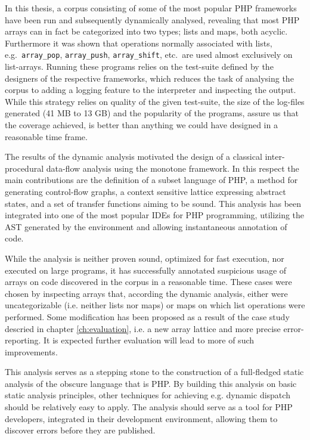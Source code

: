 

In this thesis, a corpus consisting of some of the most popular PHP frameworks have been run and subsequently dynamically analysed, revealing that most PHP arrays can in fact be categorized into two types; lists and maps, both acyclic. Furthermore it was shown that operations normally associated with lists, e.g.\ \texttt{array\_pop}, \texttt{array\_push}, \texttt{array\_shift}, etc.\, are used almost exclusively on list-arrays. Running these programs relies on the test-suite defined by the designers of the respective frameworks, which reduces the task of analysing the corpus to adding a logging feature to the interpreter and inspecting the output. While this strategy relies on quality of the given test-suite, the size of the log-files generated (41 MB to 13 GB) and the popularity of the programs, assure us that the coverage achieved, is better than anything we could have designed in a reasonable time frame. 


The results of the dynamic analysis motivated the design of a classical inter-procedural data-flow analysis using the monotone framework. In this respect the main contributions are the definition of a subset language of PHP, a method for generating control-flow graphs, a context sensitive lattice expressing abstract states, and a set of transfer functions aiming to be sound. This analysis has been integrated into one of the most popular IDEs for PHP programming, utilizing the AST generated by the environment and allowing instantaneous annotation of code. 

While the analysis is neither proven sound, optimized for fast execution, nor executed on large programs, it has successfully annotated suspicious usage of arrays on code discovered in the corpus in a reasonable time. These cases were chosen by inspecting arrays that, according the dynamic analysis, either were uncategorizable (i.e. neither lists nor maps) or maps on which list operations were performed.  Some modification has been proposed as a result of the case study descried in chapter \ref{ch:evaluation}, i.e. a new array lattice and more precise error-reporting. It is expected further evaluation will lead to more of such improvements.

This analysis serves as a stepping stone to the construction of a full-fledged static analysis of the obscure language that is PHP. By building this analysis on basic static analysis principles, other techniques for achieving e.g. dynamic dispatch should be relatively easy to apply. The analysis should serve as a tool for PHP developers, integrated in their development environment, allowing them to discover errors before they are published. 




